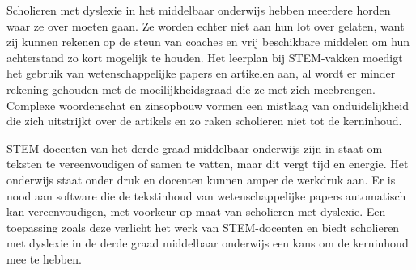 
Scholieren met dyslexie in het middelbaar onderwijs hebben meerdere horden waar ze over moeten gaan. Ze worden echter niet aan hun lot over gelaten, want zij kunnen rekenen op de steun van coaches en vrij beschikbare middelen om hun achterstand zo kort mogelijk te houden. Het leerplan bij STEM-vakken moedigt het gebruik van wetenschappelijke papers en artikelen aan, al wordt er minder rekening gehouden met de moeilijkheidsgraad die ze met zich meebrengen. Complexe woordenschat en zinsopbouw vormen een mistlaag van onduidelijkheid die zich uitstrijkt over de artikels en zo raken scholieren niet tot de kerninhoud.


STEM-docenten van het derde graad middelbaar onderwijs zijn in staat om teksten te vereenvoudigen of samen te vatten, maar dit vergt tijd en energie. Het onderwijs staat onder druk en docenten kunnen amper de werkdruk aan. Er is nood aan software die de tekstinhoud van wetenschappelijke papers automatisch kan vereenvoudigen, met voorkeur op maat van scholieren met dyslexie. Een toepassing zoals deze verlicht het werk van STEM-docenten en biedt scholieren met dyslexie in de derde graad middelbaar onderwijs een kans om de kerninhoud mee te hebben.


\section{}%
\label{sec:onderzoeksvraag}


\section{}%
\label{sec:onderzoeksdoelstelling}


